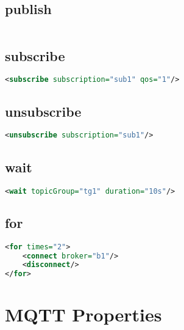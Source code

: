 \subsection{publish}
\begin{lstlisting}[caption={XMl definition of a publish commmand}, captionpos=b, label={lst:publish}, language=XML]
%TODO 
\end{lstlisting}
\subsection{subscribe}
\begin{lstlisting}[caption={XMl definition of a subscibe command}, captionpos=b, label={lst:subscirbe}, language=XML]
<subscribe subscription="sub1" qos="1"/>
\end{lstlisting}
\subsection{unsubscribe}
\begin{lstlisting}[caption={XMl definition of a unsubscibe command}, captionpos=b, label={lst:unsubscirbe}, language=XML]
<unsubscribe subscription="sub1"/>
\end{lstlisting}
\subsection{wait}
\begin{lstlisting}[caption={XMl definition of a wait command}, captionpos=b, label={lst:wait}, language=XML]
<wait topicGroup="tg1" duration="10s"/>
\end{lstlisting}
\subsection{for}
\begin{lstlisting}[caption={XMl definition of a for command}, captionpos=b, label={lst:for}, language=XML]
<for times="2">
	<connect broker="b1"/>
	<disconnect/>
</for>
\end{lstlisting}

\section{MQTT Properties}\label{sec:mqttProperties}



